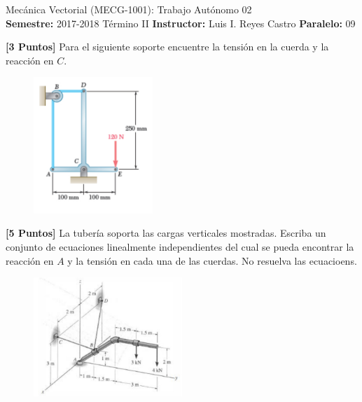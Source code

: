 \documentclass[ a4paper, twoside, 11pt]{article}
\newcommand{\numero}{02}
\begin{document}
\allowdisplaybreaks

\begin{center}
\Large Mec\'anica Vectorial (MECG-1001): Trabajo Aut\'onomo \numero \\[2ex]
\small \textbf{Semestre:} 2017-2018 T\'ermino II \qquad
\textbf{Instructor:} Luis I. Reyes Castro \qquad
\textbf{Paralelo:} 09
\end{center}
\fullskip

\begin{problem}
\textbf{[3 Puntos]} Para el siguiente soporte encuentre la tensi\'on en la cuerda y la reacci\'on en $C$. 

\begin{figure}[htb]
\centering
\includegraphics[width=0.4\textwidth]{problema-1.jpg}
\end{figure}

\end{problem}
\vspace{\baselineskip}

\begin{problem}
\textbf{[5 Puntos]} La tuber\'ia soporta las cargas verticales mostradas. Escriba un conjunto de ecuaciones linealmente independientes del cual se pueda encontrar la reacci\'on en $A$ \linebreak y la tensi\'on en cada una de las cuerdas. No resuelva las ecuacioens. 

\begin{figure}[htb]
\centering
\includegraphics[width=0.5\textwidth]{problema-2.jpg}
\end{figure}

\end{problem}
\vspace{\baselineskip}
\end{document}
